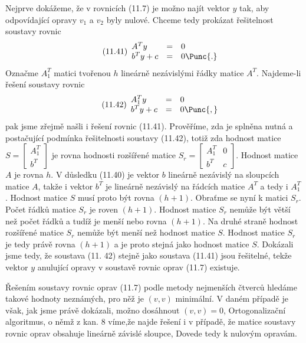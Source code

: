 Nejprve dokážeme, že v rovnicích (11.7) je možno najít vektor $y$ tak,
aby odpovídající opravy $v_1$ a $v_2$ byly nulové. Chceme tedy
prokázat řešitelnost soustavy rovnic
%
\begin{align*}
  \tag{11.41}
  \begin{array}{lll}
  A^Ty     & =& 0 \\
  b^Ty + c & =& 0 \Punc{.}
  \end{array}
\end{align*}
%
Označme $A_1^T$ matici tvořenou $h$ lineárně nezávislými řádky matice
$A^T$. Najdeme-li řešení soustavy rovnic
%
\begin{align*}
  \tag{11.42}
  \begin{array}{lll}
  A_1^Ty   & =& 0 \\
  b^Ty + c & =& 0 \Punc{,}
  \end{array}
\end{align*}
%
pak jsme zřejmě našli i řešení rovnic (11.41). Prověříme, zda
je splněna nutná a postačující podmínka řešitelnosti soustavy
(11.42), totiž zda hodnost matice
%
$ S = \left[\begin{array}{c}A_1^T \\ b^T \end{array} \right] $
%
je rovna hodnosti rozšířené matice 
%
$
S_r = \left[
  \begin{array}{cc}
    A_1^T & 0 \\ b^T & c
  \end{array}
  \right]
$.
%
Hodnost matice $A$ je rovna $h$.  V důsledku (11.40) je vektor $b$
lineárně nezávislý na sloupcích matice $A$, takže i vektor $b^T$ je
lineárně nezávislý na řádcích matice $A^T$ a tedy i $A_1^T$. Hodnost
matice $S$ musí proto být rovna $(h+1)$.  Obraťme se nyní k matici
$S_r$. Počet řádků matice $S_r$ je roven $(h+1)$.  Hodnost matice
$S_r$ nemůže být větší než počet řádků a tudíž je menší nebo rovna
$(h+1)$.  Na druhé straně hodnost rozšířené matice $S_r$ nemůže být
menší než hodnost matice $S$.  Hodnost matice $S_r$ je tedy právě
rovna $(h+1)$ a je proto stejná jako hodnost matice $S$. Dokázali jsme
tedy, že soustava (11. 42) stejně jako soustava (11.41) jsou
řešitelné, tekže vektor $y$ anulující opravy v soustavě rovnic oprav
(11.7) existuje.

Řešením soustavy rovnic oprav (11.7) podle metody nejmenších
čtverců hledáme takové hodnoty neznámých, pro něž je $(v,v)$
minimální. V daném případě je však, jak jsme právě dokázali,
možno dosáhnout $(v,v) = 0$, Ortogonalizační algoritmus, o němž z
kan. 8 víme,že najde řešení i v případě, že matice soustavy
rovnic oprav obsahuje lineárně závislé sloupce, Dovede tedy k
nulovým opravám.



